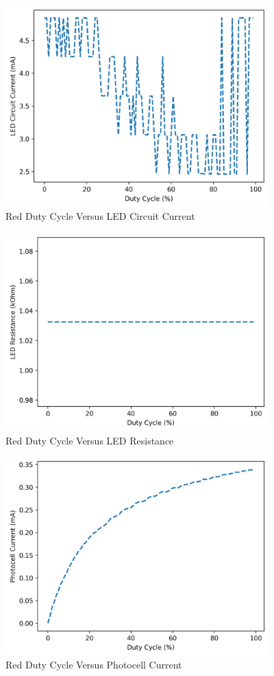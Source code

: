 \documentclass[12pt,titlepage]{article}
\begin{document}
\begin{figure}[!htb]
  \centering
  \includegraphics[width=4in]{lab_4/red_duty_cycle_led_circuit_curr.png}
  \caption{Red Duty Cycle Versus LED Circuit Current}
\end{figure}
\begin{figure}[!htb]
  \centering
  \includegraphics[width=4in]{lab_4/red_duty_cycle_led_res.png}
  \caption{Red Duty Cycle Versus LED Resistance}
\end{figure}
\begin{figure}[!htb]
  \centering
  \includegraphics[width=4in]{lab_4/red_duty_cycle_photo_curr.png}
  \caption{Red Duty Cycle Versus Photocell Current}
\end{figure}
\end{document}

